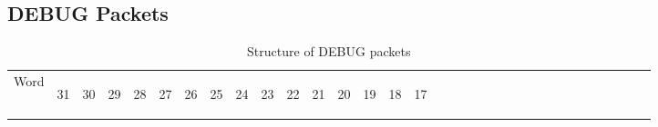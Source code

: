 \documentclass[11pt]{article}
\begin{document}
\subsection{DEBUG Packets}
\begin{table}[h!]
    \centering
    \caption{Structure of DEBUG packets}
    \label{tab:debugDef}
    \begin{tabular}{|p{1cm}|p{0.04cm}|p{0.04cm}|m{0.04cm}|m{0.04cm}|m{0.04cm}|m{0.04cm}|m{0.04cm}|m{0.04cm}|m{0.04cm}|
        m{0.04cm}|m{0.04cm}|m{0.04cm}|m{0.04cm}|m{0.04cm}|m{0.04cm}|m{0.04cm}|m{0.04cm}|m{0.04cm}|m{0.04cm}|m{0.04cm}|
        m{0.04cm}|m{0.04cm}|m{0.04cm}|m{0.04cm}|m{0.04cm}|m{0.04cm}|m{0.04cm}|m{0.04cm}|m{0.04cm}|m{0.04cm}|m{0.04cm}|m{0.04cm}|}
        \hline
        Word & 
        \begin{sideways}31\end{sideways} &
        \begin{sideways}30\end{sideways} & 
        \begin{sideways}29\end{sideways} &
        \begin{sideways}28\end{sideways} &
        \begin{sideways}27\end{sideways} &
        \begin{sideways}26\end{sideways} &
        \begin{sideways}25\end{sideways} &
        \begin{sideways}24\end{sideways} &
        \begin{sideways}23\end{sideways} &
        \begin{sideways}22\end{sideways} &
        \begin{sideways}21\end{sideways} &
        \begin{sideways}20\end{sideways} &
        \begin{sideways}19\end{sideways} &
        \begin{sideways}18\end{sideways} &
        \begin{sideways}17\end{sideways} &

\end{tabular}
\end{table}
\end{document}
